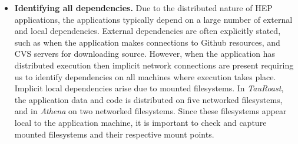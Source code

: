 \begin{itemize}

\item {\bf Identifying all dependencies.}  Due to the distributed nature of HEP applications, the applications typically depend on a large number of external and local dependencies.
External dependencies are often explicitly stated, such as when the application makes connections to Github resources, and CVS servers for downloading source. 
However, when the application has distributed execution then implicit network connections are present requiring us to identify dependencies on all machines where execution takes place. 
Implicit local dependencies arise due to mounted filesystems. In \emph{TauRoast}, the application data and code is distributed on five networked filesystems, and in \emph{Athena} on two networked filesystems. 
Since these filesystems appear local to the application machine, it is important to check and capture mounted filesystems and their respective mount points. 

%





\end{itemize}
